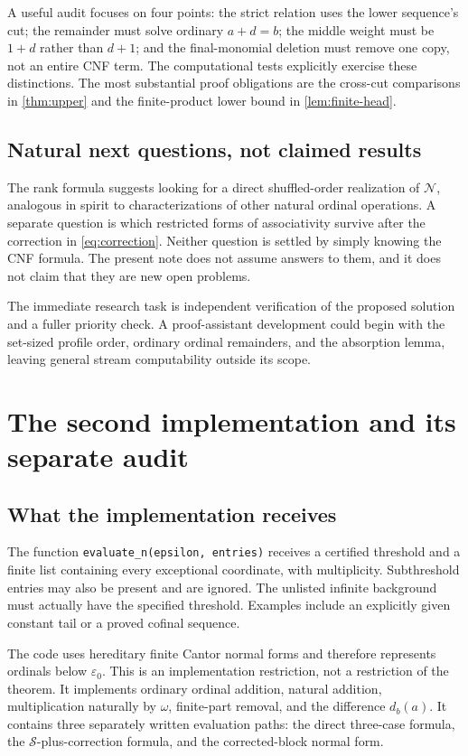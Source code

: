 \documentclass[11pt,a4paper]{article}
\theoremstyle{definition}
\newcommand{\OpN}{\mathcal N}
\newcommand{\OpS}{\mathcal S}
\begin{document}
A useful audit focuses on four points: the strict relation uses the lower
sequence's cut; the remainder must solve ordinary $a+d=b$; the middle weight
must be $1+d$ rather than $d+1$; and the final-monomial deletion must remove
one copy, not an entire CNF term. The computational tests explicitly exercise
these distinctions. The most substantial proof obligations are the
cross-cut comparisons in \cref{thm:upper} and the finite-product lower bound
in \cref{lem:finite-head}.

\subsection{Natural next questions, not claimed results}
The rank formula suggests looking for a direct shuffled-order realization of
$\OpN$, analogous in spirit to characterizations of other natural ordinal
operations. A separate question is which restricted forms of associativity
survive after the correction in \eqref{eq:correction}. Neither question is
settled by simply knowing the CNF formula. The present note does not assume
answers to them, and it does not claim that they are new open problems.

The immediate research task is independent verification of the proposed
solution and a fuller priority check. A proof-assistant development could
begin with the set-sized profile order, ordinary ordinal remainders, and the
absorption lemma, leaving general stream computability outside its scope.

\section{The second implementation and its separate audit}\label{block:sec:computation}

\subsection{What the implementation receives}

The function \texttt{evaluate\_n(epsilon, entries)} receives a certified threshold and a finite list containing every exceptional coordinate, with multiplicity. Subthreshold entries may also be present and are ignored. The unlisted infinite background must actually have the specified threshold. Examples include an explicitly given constant tail or a proved cofinal sequence.

The code uses hereditary finite Cantor normal forms and therefore represents ordinals below $\varepsilon_0$. This is an implementation restriction, not a restriction of the theorem. It implements ordinary ordinal addition, natural addition, multiplication naturally by $\omega$, finite-part removal, and the difference $d_b(a)$. It contains three separately written evaluation paths: the direct three-case formula, the $\OpS$-plus-correction formula, and the corrected-block normal form.
\end{document}
